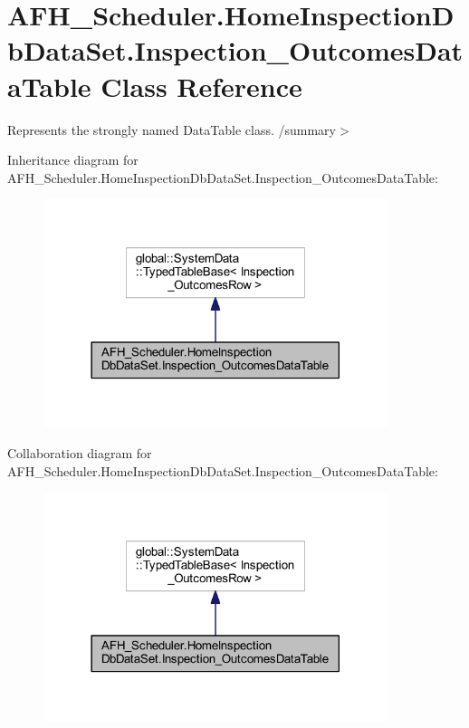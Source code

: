 \section{A\+F\+H\+\_\+\+Scheduler.\+Home\+Inspection\+Db\+Data\+Set.\+Inspection\+\_\+\+Outcomes\+Data\+Table Class Reference}
\label{class_a_f_h___scheduler_1_1_home_inspection_db_data_set_1_1_inspection___outcomes_data_table}


Represents the strongly named Data\+Table class. /summary$>$  




Inheritance diagram for A\+F\+H\+\_\+\+Scheduler.\+Home\+Inspection\+Db\+Data\+Set.\+Inspection\+\_\+\+Outcomes\+Data\+Table\+:
\nopagebreak
\begin{figure}[H]
\begin{center}
\leavevmode
\includegraphics[width=285pt]{class_a_f_h___scheduler_1_1_home_inspection_db_data_set_1_1_inspection___outcomes_data_table__inherit__graph}
\end{center}
\end{figure}


Collaboration diagram for A\+F\+H\+\_\+\+Scheduler.\+Home\+Inspection\+Db\+Data\+Set.\+Inspection\+\_\+\+Outcomes\+Data\+Table\+:
\nopagebreak
\begin{figure}[H]
\begin{center}
\leavevmode
\includegraphics[width=285pt]{class_a_f_h___scheduler_1_1_home_inspection_db_data_set_1_1_inspection___outcomes_data_table__coll__graph}
\end{center}
\end{figure}
